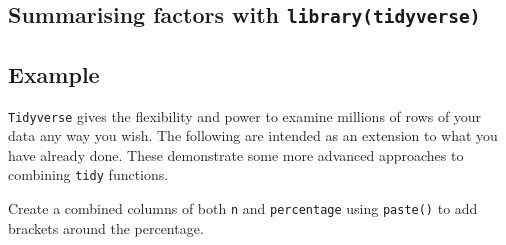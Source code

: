 \documentclass[12pt,]{krantz}
\makeatletter
\newenvironment{Shaded}{\begin{snugshade}}{\end{snugshade}}
\newcommand{\CommentTok}[1]{\textcolor[rgb]{0.56,0.35,0.01}{\textit{#1}}}
\newcommand{\DataTypeTok}[1]{\textcolor[rgb]{0.13,0.29,0.53}{#1}}
\newcommand{\DecValTok}[1]{\textcolor[rgb]{0.00,0.00,0.81}{#1}}
\newcommand{\KeywordTok}[1]{\textcolor[rgb]{0.13,0.29,0.53}{\textbf{#1}}}
\newcommand{\NormalTok}[1]{#1}
\newcommand{\OperatorTok}[1]{\textcolor[rgb]{0.81,0.36,0.00}{\textbf{#1}}}
\newcommand{\StringTok}[1]{\textcolor[rgb]{0.31,0.60,0.02}{#1}}
\newenvironment{kframe}{%
\medskip{}
\setlength{\fboxsep}{.8em}
 \def\at@end@of@kframe{}%
 \ifinner\ifhmode%
  \def\at@end@of@kframe{\end{minipage}}%
  \begin{minipage}{\columnwidth}%
 \fi\fi%
 \def\FrameCommand##1{\hskip\@totalleftmargin \hskip-\fboxsep
 \colorbox{shadecolor}{##1}\hskip-\fboxsep
     \hskip-\linewidth \hskip-\@totalleftmargin \hskip\columnwidth}%
 \MakeFramed {\advance\hsize-\width
   \@totalleftmargin\z@ \linewidth\hsize
   \@setminipage}}%
 {\par\unskip\endMakeFramed%
 \at@end@of@kframe}
\renewenvironment{Shaded}{\begin{kframe}}{\end{kframe}}
\theoremstyle{definition}
\theoremstyle{definition}
\theoremstyle{definition}
\theoremstyle{remark}
\makeatother
\begin{document}
\hypertarget{summarising-factors-with-librarytidyverse}{%
\subsection{\texorpdfstring{Summarising factors with
\texttt{library(tidyverse)}}{Summarising factors with library(tidyverse)}}\label{summarising-factors-with-librarytidyverse}}

\hypertarget{example}{%
\subsection{Example}\label{example}}

\texttt{Tidyverse} gives the flexibility and power to examine millions
of rows of your data any way you wish. The following are intended as an
extension to what you have already done. These demonstrate some more
advanced approaches to combining \texttt{tidy} functions.

\begin{Shaded}
\end{Shaded}

\begin{Shaded}
\end{Shaded}

Create a combined columns of both \texttt{n} and \texttt{percentage}
using \texttt{paste()} to add brackets around the percentage.
\end{document}
